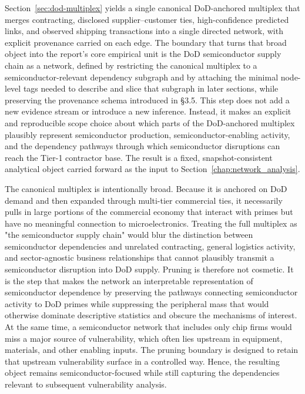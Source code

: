 Section~\ref{sec:dod-multiplex} yields a single canonical DoD-anchored multiplex that merges contracting, disclosed supplier--customer ties, high-confidence predicted links, and observed shipping transactions into a single directed network, with explicit provenance carried on each edge. The boundary that turns that broad object into the report's core empirical unit is the DoD semiconductor supply chain as a network, defined by restricting the canonical multiplex to a semiconductor-relevant dependency subgraph and by attaching the minimal node-level tags needed to describe and slice that subgraph in later sections, while preserving the provenance schema introduced in \S3.5. This step does not add a new evidence stream or introduce a new inference. Instead, it makes an explicit and reproducible scope choice about which parts of the DoD-anchored multiplex plausibly represent semiconductor production, semiconductor-enabling activity, and the dependency pathways through which semiconductor disruptions can reach the Tier-1 contractor base. The result is a fixed, snapshot-consistent analytical object carried forward as the input to Section~\ref{chap:network_analysis}.

The canonical multiplex is intentionally broad. Because it is anchored on DoD demand and then expanded through multi-tier commercial ties, it necessarily pulls in large portions of the commercial economy that interact with primes but have no meaningful connection to microelectronics. Treating the full multiplex as "the semiconductor supply chain" would blur the distinction between semiconductor dependencies and unrelated contracting, general logistics activity, and sector-agnostic business relationships that cannot plausibly transmit a semiconductor disruption into DoD supply. Pruning is therefore not cosmetic. It is the step that makes the network an interpretable representation of semiconductor dependence by preserving the pathways connecting semiconductor activity to DoD primes while suppressing the peripheral mass that would otherwise dominate descriptive statistics and obscure the mechanisms of interest. At the same time, a semiconductor network that includes only chip firms would miss a major source of vulnerability, which often lies upstream in equipment, materials, and other enabling inputs. The pruning boundary is designed to retain that upstream vulnerability surface in a controlled way. Hence, the resulting object remains semiconductor-focused while still capturing the dependencies relevant to subsequent vulnerability analysis.


